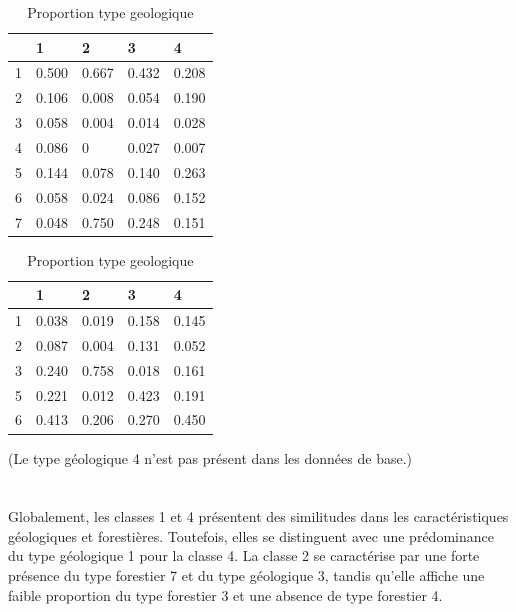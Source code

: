 \documentclass{article}
\begin{document}
\begin{table}[htbp]
    \centering
    \begin{minipage}{0.48\textwidth} %
        \centering
        \begin{tabular}{|l|l|l|l|l|}
        \hline
                            & 1     & 2     & 3     & 4     \\ \hline
        1                   & 0.500 & 0.667 & 0.432 & 0.208 \\ \hline
        2                   & 0.106 & 0.008 & 0.054 & 0.190 \\ \hline
        3                   & 0.058 & 0.004 & 0.014 & 0.028 \\ \hline
        4                   & 0.086 & 0     & 0.027 & 0.007 \\ \hline
        5                   & 0.144 & 0.078 & 0.140 & 0.263 \\ \hline
        6                   & 0.058 & 0.024 & 0.086 & 0.152 \\ \hline
        7                   & 0.048 & 0.750 & 0.248 & 0.151 \\ \hline
        \end{tabular}
        \caption{Proportion type forestier}
    \end{minipage}\hfill %
    \begin{minipage}{0.48\textwidth} %
        \centering

        \begin{tabular}{|l|l|l|l|l|}
        \hline
                            & 1     & 2     & 3     & 4     \\ \hline
        1                   & 0.038 & 0.019 & 0.158 & 0.145 \\ \hline
        2                   & 0.087 & 0.004 & 0.131 & 0.052 \\ \hline
        3                   & 0.240 & 0.758 & 0.018 & 0.161 \\ \hline
        5                   & 0.221 & 0.012 & 0.423 & 0.191 \\ \hline
        6                   & 0.413 & 0.206 & 0.270 & 0.450 \\ \hline
        \end{tabular}
        \caption{Proportion type geologique}
    \end{minipage}
\end{table}
\newpage
(Le type géologique 4 n'est pas présent dans les données de base.)
\\
\\
\\
Globalement, les classes 1 et 4 présentent des similitudes dans les caractéristiques géologiques et forestières. Toutefois, elles se distinguent avec une prédominance du type géologique 1 pour la classe 4.
La classe 2 se caractérise par une forte présence du type forestier 7 et du type géologique 3, tandis qu'elle affiche une faible proportion du type forestier 3 et une absence de type forestier 4.
\end{document}
